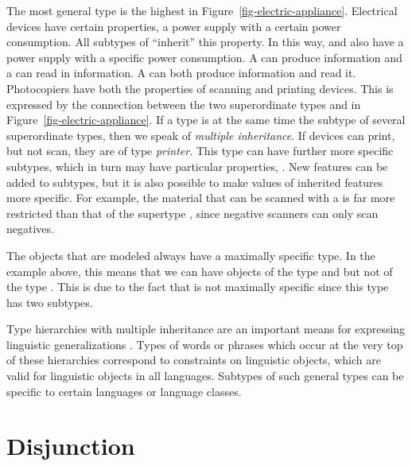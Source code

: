 The most general type  is the highest in Figure~\ref{fig-electric-appliance}. Electrical devices have certain properties, \eg 
a power supply with a certain power consumption. All subtypes of   ``inherit'' this property. In this way,  and
 also have a power supply with a specific power consumption. A
 can produce information and a  can read in information. A  can both produce information and read it. Photocopiers have both the properties of scanning and printing devices.
This is expressed by the connection between the two superordinate types and  in
Figure~\ref{fig-electric-appliance}. If a type is at the same time the subtype of several superordinate types, then we
speak of \emph{multiple inheritance}. If devices can print, but not scan, they are of type \emph{printer}. This type can have further more
specific subtypes, which in turn may have particular properties, \eg {}. New
features can be added to subtypes, but it is also possible to make values of inherited features more
specific. For example, the material that can be scanned with a  is far more
restricted than that of the supertype , since negative scanners can only scan negatives.

The objects that are modeled always have a maximally specific type. In the example above, this means that we can have objects of the type  and 
but not of the type . This is due to the fact that  is not maximally specific since this type has two subtypes.

Type hierarchies with multiple inheritance are an important means for expressing linguistic generalizations \citep*{FPW85a,Flickinger87,Sag97a}. Types of words or phrases which
occur at the very top of these hierarchies correspond to constraints on linguistic objects, which are valid for linguistic objects in all languages. Subtypes of such general types
can be specific to certain languages or language classes.%

\section{Disjunction}

